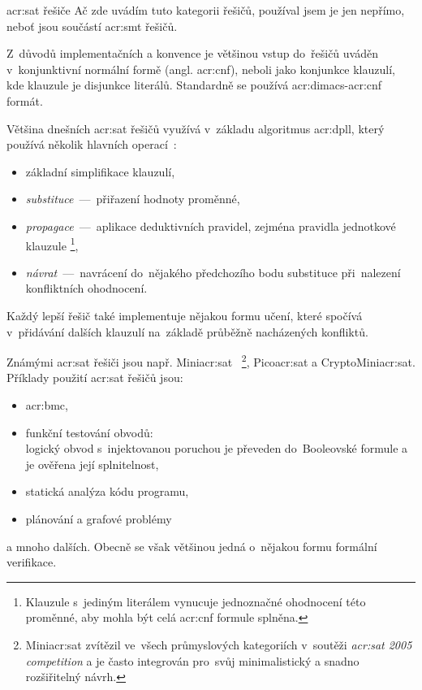 \documentclass[thesis=M,czech]{FITthesis}[2012/06/26]
\newcommand{\acrlabel}[1]{acr:#1}
\newcommand{\acr}[1]{\acrshort{\acrlabel{#1}}}
\newcommand{\acrf}[1]{\acrfull{\acrlabel{#1}}}
\newcommand{\hl}[1]{\textit{#1}}
\newcommand{\name}[1]{\hl{#1}}
\newcommand{\cit}[1]{\cite{#1}}
\begin{document}
\begin{section}{\acr{sat} řešiče}\label{s:search:sat}
Ač zde uvádím tuto kategorii řešičů,
používal jsem je jen nepřímo,
neboť jsou součástí \acr{smt} řešičů.

Z~důvodů implementačních a konvence
je většinou vstup do~řešičů uváděn
v~konjunktivní normální formě (angl. \acr{cnf}),
neboli jako konjunkce klauzulí,
kde klauzule je disjunkce literálů.
Standardně se používá \acr{dimacs}-\acr{cnf} formát.

Většina dnešních \acr{sat} řešičů
využívá v~základu algoritmus \acrf{dpll},
který používá několik hlavních operací~\cit{smt-de_moura}:
\begin{itemize}
\item základní simplifikace klauzulí,
\item \hl{substituce}~---~přiřazení hodnoty proměnné,
\item \hl{propagace}~---~aplikace deduktivních pravidel,
   zejména pravidla jednotkové klauzule%
   \footnote{Klauzule s~jediným literálem
   vynucuje jednoznačné ohodnocení této proměnné, aby mohla být celá
   \acr{cnf} formule splněna.},
\item \hl{návrat}~---~navrácení do~nějakého předchozího bodu substituce
   při~nalezení konfliktních ohodnocení.
\end{itemize}

Každý lepší řešič také implementuje nějakou formu učení,
které spočívá v~přidávání dalších klauzulí
na~základě průběžně nacházených konfliktů.

Známými \acr{sat} řešiči jsou např. Mini\acr{sat}~\cit{minisat}%
\footnote{Mini\acr{sat} zvítězil
ve~všech průmyslových kategoriích
v~soutěži \name{\acr{sat} 2005 competition}
a je často integrován pro~svůj
minimalistický a snadno rozšiřitelný návrh.},
Pico\acr{sat} a CryptoMini\acr{sat}.
Příklady použití \acr{sat} řešičů jsou:
\begin{itemize}
\item \acrf{bmc},
\item funkční testování obvodů:\\
   logický obvod s~injektovanou poruchou
   je převeden do~Booleovské formule
   a je ověřena její splnitelnost,
\item statická analýza kódu programu,
\item plánování a grafové problémy
\end{itemize}
a mnoho dalších. Obecně se však většinou jedná
o~nějakou formu formální verifikace.
\end{section} %
\end{document}
